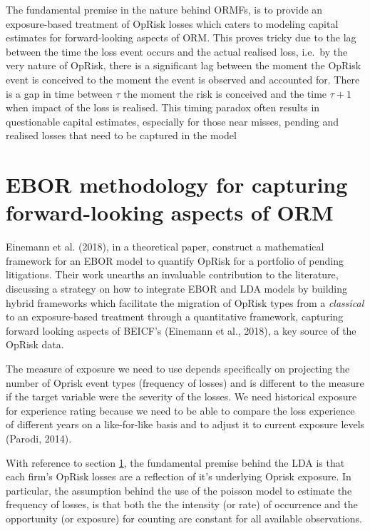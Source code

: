 \documentclass[]{DissertateUSU}
\begin{document}
The fundamental premise in the nature behind ORMFs, is to provide an
exposure-based treatment of OpRisk losses which caters to modeling
capital estimates for forward-looking aspects of ORM. This proves tricky
due to the lag between the time the loss event occurs and the actual
realised loss, i.e.~by the very nature of OpRisk, there is a significant
lag between the moment the OpRisk event is conceived to the moment the
event is observed and accounted for. There is a gap in time between
\(\tau\) the moment the risk is conceived and the time \(\tau+1\) when
impact of the loss is realised. This timing paradox often results in
questionable capital estimates, especially for those near misses,
pending and realised losses that need to be captured in the model

\section{EBOR methodology for capturing forward-looking aspects of ORM}
\label{sec:EBOR methodology for capturing forward-looking aspects of ORM}

Einemann et al. (2018), in a theoretical paper, construct a mathematical
framework for an EBOR model to quantify OpRisk for a portfolio of
pending litigations. Their work unearths an invaluable contribution to
the literature, discussing a strategy on how to integrate EBOR and LDA
models by building hybrid frameworks which facilitate the migration of
OpRisk types from a \emph{classical} to an exposure-based treatment
through a quantitative framework, capturing forward looking aspects of
BEICF's (Einemann et al., 2018), a key source of the OpRisk data.

The measure of exposure we need to use depends specifically on
projecting the number of Oprisk event types (frequency of losses) and is
different to the measure if the target variable were the severity of the
losses. We need historical exposure for experience rating because we
need to be able to compare the loss experience of different years on a
like-for-like basis and to adjust it to current exposure levels (Parodi,
2014).\medskip 

With reference to section
\ref{sec:EBOR methodology for capturing forward-looking aspects of ORM},
the fundamental premise behind the LDA is that each firm's OpRisk losses
are a reflection of it's underlying Oprisk exposure. In particular, the
assumption behind the use of the poisson model to estimate the frequency
of losses, is that both the the intensity (or rate) of occurrence and
the opportunity (or exposure) for counting are constant for all
available observations.\medskip
\end{document}
